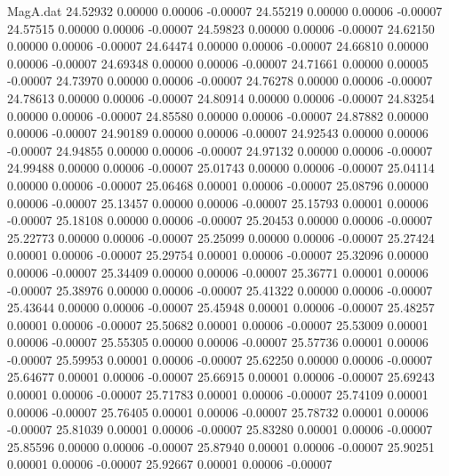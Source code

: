 \begin{filecontents}{MagA.dat}
  24.52932    0.00000    0.00006   -0.00007
  24.55219    0.00000    0.00006   -0.00007
  24.57515    0.00000    0.00006   -0.00007
  24.59823    0.00000    0.00006   -0.00007
  24.62150    0.00000    0.00006   -0.00007
  24.64474    0.00000    0.00006   -0.00007
  24.66810    0.00000    0.00006   -0.00007
  24.69348    0.00000    0.00006   -0.00007
  24.71661    0.00000    0.00005   -0.00007
  24.73970    0.00000    0.00006   -0.00007
  24.76278    0.00000    0.00006   -0.00007
  24.78613    0.00000    0.00006   -0.00007
  24.80914    0.00000    0.00006   -0.00007
  24.83254    0.00000    0.00006   -0.00007
  24.85580    0.00000    0.00006   -0.00007
  24.87882    0.00000    0.00006   -0.00007
  24.90189    0.00000    0.00006   -0.00007
  24.92543    0.00000    0.00006   -0.00007
  24.94855    0.00000    0.00006   -0.00007
  24.97132    0.00000    0.00006   -0.00007
  24.99488    0.00000    0.00006   -0.00007
  25.01743    0.00000    0.00006   -0.00007
  25.04114    0.00000    0.00006   -0.00007
  25.06468    0.00001    0.00006   -0.00007
  25.08796    0.00000    0.00006   -0.00007
  25.13457    0.00000    0.00006   -0.00007
  25.15793    0.00001    0.00006   -0.00007
  25.18108    0.00000    0.00006   -0.00007
  25.20453    0.00000    0.00006   -0.00007
  25.22773    0.00000    0.00006   -0.00007
  25.25099    0.00000    0.00006   -0.00007
  25.27424    0.00001    0.00006   -0.00007
  25.29754    0.00001    0.00006   -0.00007
  25.32096    0.00000    0.00006   -0.00007
  25.34409    0.00000    0.00006   -0.00007
  25.36771    0.00001    0.00006   -0.00007
  25.38976    0.00000    0.00006   -0.00007
  25.41322    0.00000    0.00006   -0.00007
  25.43644    0.00000    0.00006   -0.00007
  25.45948    0.00001    0.00006   -0.00007
  25.48257    0.00001    0.00006   -0.00007
  25.50682    0.00001    0.00006   -0.00007
  25.53009    0.00001    0.00006   -0.00007
  25.55305    0.00000    0.00006   -0.00007
  25.57736    0.00001    0.00006   -0.00007
  25.59953    0.00001    0.00006   -0.00007
  25.62250    0.00000    0.00006   -0.00007
  25.64677    0.00001    0.00006   -0.00007
  25.66915    0.00001    0.00006   -0.00007
  25.69243    0.00001    0.00006   -0.00007
  25.71783    0.00001    0.00006   -0.00007
  25.74109    0.00001    0.00006   -0.00007
  25.76405    0.00001    0.00006   -0.00007
  25.78732    0.00001    0.00006   -0.00007
  25.81039    0.00001    0.00006   -0.00007
  25.83280    0.00001    0.00006   -0.00007
  25.85596    0.00000    0.00006   -0.00007
  25.87940    0.00001    0.00006   -0.00007
  25.90251    0.00001    0.00006   -0.00007
  25.92667    0.00001    0.00006   -0.00007

\end{filecontents}
